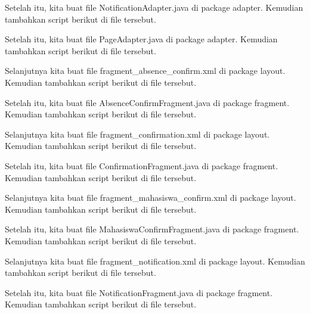 Setelah itu, kita buat file NotificationAdapter.java di package adapter. Kemudian tambahkan script berikut di file tersebut.


Setelah itu, kita buat file PageAdapter.java di package adapter. Kemudian tambahkan script berikut di file tersebut.


Selanjutnya kita buat file fragment\_absence\_confirm.xml di package layout. Kemudian tambahkan script berikut di file tersebut.


Setelah itu, kita buat file AbsenceConfirmFragment.java di package fragment. Kemudian tambahkan script berikut di file tersebut.


Selanjutnya kita buat file fragment\_confirmation.xml di package layout. Kemudian tambahkan script berikut di file tersebut.


Setelah itu, kita buat file ConfirmationFragment.java di package fragment. Kemudian tambahkan script berikut di file tersebut.


Selanjutnya kita buat file fragment\_mahasiswa\_confirm.xml di package layout. Kemudian tambahkan script berikut di file tersebut.


Setelah itu, kita buat file MahasiswaConfirmFragment.java di package fragment. Kemudian tambahkan script berikut di file tersebut.


Selanjutnya kita buat file fragment\_notification.xml di package layout. Kemudian tambahkan script berikut di file tersebut.


Setelah itu, kita buat file NotificationFragment.java di package fragment. Kemudian tambahkan script berikut di file tersebut.


